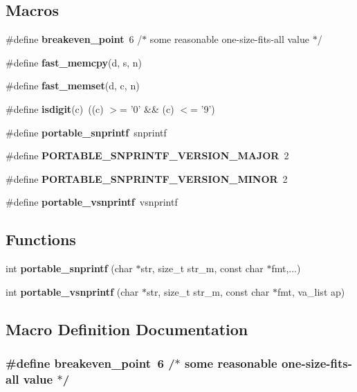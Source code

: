 \subsection*{Macros}
\begin{DoxyCompactItemize}
\item 
\#define {\bf breakeven\-\_\-point}~6	/$\ast$ some reasonable one-\/size-\/fits-\/all value $\ast$/
\item 
\#define {\bf fast\-\_\-memcpy}(d, s, n)
\item 
\#define {\bf fast\-\_\-memset}(d, c, n)
\item 
\#define {\bf isdigit}(c)~((c) $>$= '0' \&\& (c) $<$= '9')
\item 
\#define {\bf portable\-\_\-snprintf}~snprintf
\item 
\#define {\bf P\-O\-R\-T\-A\-B\-L\-E\-\_\-\-S\-N\-P\-R\-I\-N\-T\-F\-\_\-\-V\-E\-R\-S\-I\-O\-N\-\_\-\-M\-A\-J\-O\-R}~2
\item 
\#define {\bf P\-O\-R\-T\-A\-B\-L\-E\-\_\-\-S\-N\-P\-R\-I\-N\-T\-F\-\_\-\-V\-E\-R\-S\-I\-O\-N\-\_\-\-M\-I\-N\-O\-R}~2
\item 
\#define {\bf portable\-\_\-vsnprintf}~vsnprintf
\end{DoxyCompactItemize}
\subsection*{Functions}
\begin{DoxyCompactItemize}
\item 
int {\bf portable\-\_\-snprintf} (char $\ast$str, size\-\_\-t str\-\_\-m, const char $\ast$fmt,...)
\item 
int {\bf portable\-\_\-vsnprintf} (char $\ast$str, size\-\_\-t str\-\_\-m, const char $\ast$fmt, va\-\_\-list ap)
\end{DoxyCompactItemize}


\subsection{Macro Definition Documentation}
\subsubsection[{breakeven\-\_\-point}]{\setlength{\rightskip}{0pt plus 5cm}\#define breakeven\-\_\-point~6	/$\ast$ some reasonable one-\/size-\/fits-\/all value $\ast$/}\label{snprintf_8c_a92682423eb7bc3233c440b67a429b870}
